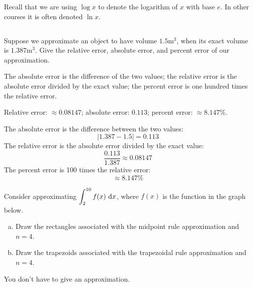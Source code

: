 %
%

\noindent
Recall that we are using $\log x$ to denote the logarithm of $x$ with
base $e$. In other courses it is often denoted $\ln x$.


\subsection*{\Conceptual}
\begin{Mquestion}
Suppose we approximate an object to have volume $1.5 \mathrm{m}^3$, when its exact volume is $1.387 \mathrm{m}^3$. Give the relative error, absolute error, and percent error of our approximation.
\end{Mquestion}
\begin{hint}
The absolute error is  the difference of the two values; the relative error is the absolute error divided by the exact value; the percent error is one hundred times the relative error.
\end{hint}
\begin{answer}
Relative error: $\approx 0.08147$; absolute error: $0.113$; percent error: $\approx 8.147\%$.
\end{answer}
\begin{solution}
The absolute error is the difference between the two values:
\[|1.387-1.5| = 0.113\]
The relative error is the absolute error divided by the exact value:
\[\frac{0.113}{1.387}\approx 0.08147\]
The percent error is 100 times the relative error:
\[\approx 8.147\%\]
\end{solution}
\begin{question}
Consider approximating $\displaystyle\int_2^{10} f(x)~\mathrm{d}x$, where $f(x)$ is the function in the graph below.
\begin{center}
\end{center}
\begin{enumerate}[(a)]
\item Draw the rectangles associated with the midpoint rule approximation and $n=4$.
\item Draw the trapezoids associated with the trapezoidal rule approximation and $n=4$.
\end{enumerate}
You don't have to give an approximation.
\end{question}

